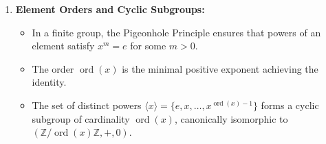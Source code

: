 \begin{overview}
\begin{enumerate}[label=\textbf{(\arabic*)}]
\begin{itemize}
        \item Function composition is applied right-to-left: $(f \circ g)(x) = f(g(x))$.
        \item Products of permutations are efficiently manipulated using disjoint cycle notation; $S_3$ is the smallest non-abelian group.
    \end{itemize}
    \item \textbf{Element Orders and Cyclic Subgroups:}
    \begin{itemize}
        \item In a finite group, the Pigeonhole Principle ensures that powers of an element satisfy $x^m = e$ for some $m > 0$.
        \item The order $\operatorname{ord}(x)$ is the minimal positive exponent achieving the identity.
        \item The set of distinct powers $\langle x \rangle = \{e, x, \dots, x^{\operatorname{ord}(x)-1}\}$ forms a cyclic subgroup of cardinality $\operatorname{ord}(x)$, canonically isomorphic to $(\mathbb{Z}/\operatorname{ord}(x)\mathbb{Z}, +, 0)$.
    \end{itemize}
\end{enumerate}
\end{overview}